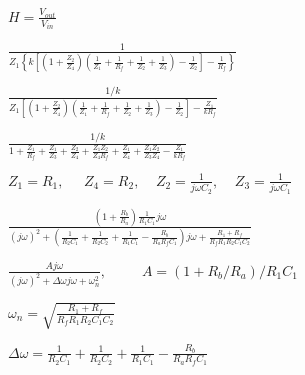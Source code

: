 \documentclass{article}
\def\lthtmlcheckvsize{\ifdim\ht\sizebox<\vsize 
  \ifdim\wd\sizebox<\hsize\expandafter\hfill\fi \expandafter\vfill
  \else\expandafter\vss\fi}%
\begin{document}
{\newpage\clearpage
{}%
$\displaystyle H=\frac{V_{out}}{V_{in}}$%
\lthtmlindisplaymathZ
\lthtmlcheckvsize\clearpage}

{\newpage\clearpage
{}%
$\displaystyle \frac{1}{Z_1\left\{k\left[\left(1+\frac{Z_2}{Z_4}\right)\left(\frac{1}{Z_1}+\frac{1}{R_f}+\frac{1}{Z_2}+\frac{1}{Z_3}\right)-\frac{1}{Z_2}\right]-\frac{1}{R_f}\right\}}$%
\lthtmlindisplaymathZ
\lthtmlcheckvsize\clearpage}

{\newpage\clearpage
{}%
$\displaystyle \frac{1/k}{Z_1\left[\left(1+\frac{Z_2}{Z_4}\right)\left(\frac{1}{Z_1}+\frac{1}{R_f}+\frac{1}{Z_2}+\frac{1}{Z_3}\right)-\frac{1}{Z_2}\right]-\frac{Z_1}{kR_f}}$%
\lthtmlindisplaymathZ
\lthtmlcheckvsize\clearpage}

{\newpage\clearpage
{}%
$\displaystyle \frac{1/k}{1+\frac{Z_1}{R_f}+\frac{Z_1}{Z_3}+\frac{Z_2}{Z_4}+\frac{Z_1Z_2}{Z_4R_f}+\frac{Z_1}{Z_4}+\frac{Z_1Z_2}{Z_3Z_4}-\frac{Z_1}{kR_f}}$%
\lthtmlindisplaymathZ
\lthtmlcheckvsize\clearpage}

{\newpage\clearpage
{}%
$\displaystyle Z_1=R_1,\;\;\;\;\;Z_4=R_2,\;\;\;\;Z_2=\frac{1}{j\omega C_2},
  \;\;\;\;Z_3=\frac{1}{j\omega C_1}
  $%
\lthtmlindisplaymathZ
\lthtmlcheckvsize\clearpage}

{\newpage\clearpage
{}%
$\displaystyle \frac{\left(1+\frac{R_b}{R_a}\right)\frac{1}{R_1C_1}j\omega}{(j\omega)^2+\left(\frac{1}{R_2C_1}+\frac{1}{R_2C_2}+\frac{1}{R_1C_1}-\frac{R_b}{R_aR_fC_1}\right)j\omega+\frac{R_1+R_f}{R_fR_1R_2C_1C_2}}$%
\lthtmlindisplaymathZ
\lthtmlcheckvsize\clearpage}

{\newpage\clearpage
{}%
$\displaystyle \frac{Aj\omega}{(j\omega)^2+\Delta\omega j\omega+\omega_n^2},
\;\;\;\;\;\;\;\;\;
A=(1+R_b/R_a)/R_1C_1$%
\lthtmlindisplaymathZ
\lthtmlcheckvsize\clearpage}

{\newpage\clearpage
{}%
$\displaystyle \omega_n=\sqrt{\frac{R_1+R_f}{R_fR_1R_2C_1C_2}}
  $%
\lthtmlindisplaymathZ
\lthtmlcheckvsize\clearpage}

{\newpage\clearpage
{}%
$\displaystyle \Delta\omega=\frac{1}{R_2C_1}+\frac{1}{R_2C_2}+\frac{1}{R_1C_1}-\frac{R_b}{R_aR_fC_1}
  $%
\lthtmlindisplaymathZ
\lthtmlcheckvsize\clearpage}
\end{document}
